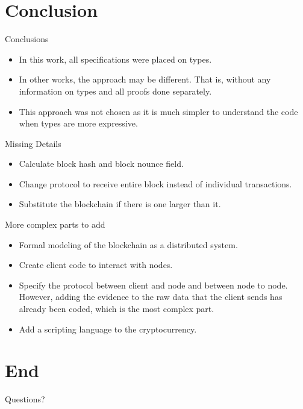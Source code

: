 \documentclass{beamer}
\begin{document}
\section{Conclusion}

\begin{frame}{Conclusions}
  \begin{itemize}[<+->]
    \item In this work, all specifications were placed on types.
    \item In other works, the approach may be different.
      That is, without any information on types and all proofs done separately.
    \item This approach was not chosen as it is much simpler to understand the code when types are more expressive.
  \end{itemize}
\end{frame}

\begin{frame}{Missing Details}
  \begin{itemize}[<+->]
    \item Calculate block hash and block nounce field.
    \item Change protocol to receive entire block instead of individual transactions.
    \item Substitute the blockchain if there is one larger than it.
  \end{itemize}
\end{frame}

\begin{frame}{More complex parts to add}
  \begin{itemize}[<+->]
    \item Formal modeling of the blockchain as a distributed system.
    \item Create client code to interact with nodes.
    \item Specify the protocol between client and node and between node to node.
          However, adding the evidence to the raw data that the client sends has already been coded,
          which is the most complex part.
    \item Add a scripting language to the cryptocurrency.
  \end{itemize}
\end{frame}

\section{End}

\begin{frame}
  \vspace*{36 pt}
  \begin{center}
  {\Huge Questions?}
  \end{center}
\end{frame}

%   
%   
\end{document}
